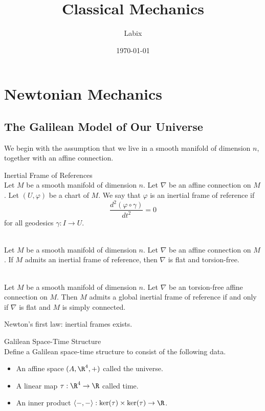 \documentclass[a4paper]{article}
\title{Classical Mechanics}
\author{Labix}
\date{\today}
\begin{document}
\maketitle
\pagebreak
\tableofcontents

\pagebreak
\section{Newtonian Mechanics}
\subsection{The Galilean Model of Our Universe}
We begin with the assumption that we live in a smooth manifold of dimension $n$, together with an affine connection. 

\begin{defn}{Inertial Frame of References}{}\\
Let $M$ be a smooth manifold of dimension $n$. Let $\nabla$ be an affine connection on $M$. Let $(U,\varphi)$ be a chart of $M$. We say that $\varphi$ is an inertial frame of reference if $$\frac{d^2(\varphi\circ\gamma)}{dt^2}=0$$ for all geodesics $\gamma:I\to U$. 
\end{defn}

\begin{lmm}{}{}\\
Let $M$ be a smooth manifold of dimension $n$. Let $\nabla$ be an affine connection on $M$. If $M$ admits an inertial frame of reference, then $\nabla$ is flat and torsion-free. 
\end{lmm}

\begin{prp}{}{}\\
Let $M$ be a smooth manifold of dimension $n$. Let $\nabla$ be an torsion-free affine connection on $M$. Then $M$ admits a global inertial frame of reference if and only if $\nabla$ is flat and $M$ is simply connected. 
\end{prp}

Newton's first law: inertial frames exists. 

\begin{defn}{Galilean Space-Time Structure}{}\\
Define a Galilean space-time structure to consist of the following data. 
\begin{itemize}
\item An affine space $(A,\R^4,+)$ called the universe. 
\item A linear map $\tau:\R^4\to\R$ called time. 
\item An inner product $\langle-,-\rangle:\ker(\tau)\times\ker(\tau)\to\R$. 
\end{itemize}
\end{defn}
\end{document}
